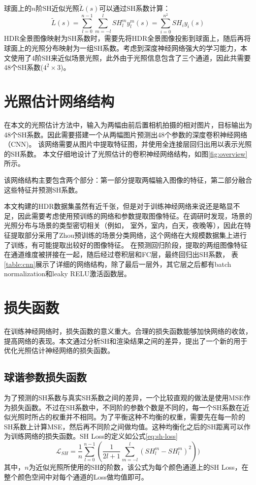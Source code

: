球面上的$n$阶SH近似光照$\tilde{L}(s)$可以通过SH系数计算：
\begin{equation}
    \tilde{L}(s)=\sum_{l=0}^{n-1}\sum_{m=-l}^{l}SH^m_ly^m_l(s)=\sum_{i=0}^{n^2}SH_iy_i(s)
\end{equation}
HDR全景图像映射为SH系数时，需要先将HDR全景图像投影到球面上，随后再将球面上的光照分布映射为一组SH系数。考虑到深度神经网络强大的学习能力，本文使用了4阶SH来近似场景光照，此外由于光照信息包含了三个通道，因此共需要48个SH系数($4^2\times3$)。
\section{光照估计网络结构}
在本文的光照估计方法中，输入为两幅由前后置相机拍摄的相对图片，目标输出为48个SH系数。因此需要搭建一个从两幅图片预测出48个参数的深度卷积神经网络（CNN)。
该网络需要从图片中提取特征图，并使用全连接层回归出用以表示光照的SH系数。
本文仔细地设计了光照估计的卷积神经网络结构，如图\ref{fig:overview}所示。



该网络结构主要包含两个部分：第一部分提取两幅输入图像的特征，第二部分融合这些特征并预测SH系数。 

本文构建的HDR数据集虽然有近千张，但是对于训练神经网络来说还是略显不足，因此需要考虑使用预训练的网络和参数提取图像特征。在调研时发现，场景的光照分布与场景的类型密切相关（例如， 室外，室内，白天，夜晚等），因此在特征提取部分采用了Zhou预训练的场景分类网络\cite{zhou2017places}，这个网络在大规模数据集上进行了训练，有可能提取出较好的图像特征。 在预测回归阶段，提取的两组图像特征在通道维度被拼接在一起，随后经过卷积层和FC层，最终回归出SH系数， 表\ref{table:cnn}展示了详细的网络结构，除了最后一层外，其它层之后都有batch normalization和leaky RELU激活函数层。


\section{损失函数}\label{sec:loss-function}
在训练神经网络时，损失函数的意义重大。合理的损失函数能够加快网络的收敛，提高网络的表现。本文通过分析SH和渲染结果之间的差异，提出了一个新的用于优化光照估计神经网络的损失函数。
\subsection{球谐参数损失函数} 为了预测的SH系数与真实SH系数之间的差异，一个比较直观的做法是使用MSE作为损失函数。不过在SH系数中，不同阶的参数个数是不同的，每一个SH系数在近似光照时所占的权重并不相同。为了平衡这种不均衡的权重，需要先在每一阶的SH系数上计算MSE，然后再不同阶之间做均值。这种均衡化之后的SH距离可以作为训练网络的损失函数。SH Loss的定义如公式\ref{eq:sh-loss}
\begin{equation}
    \mathcal{L}_{SH} = \frac{1}{n}\sum_{l=0}^{n-1}(\frac{1}{2l+1}\sum_{m=-l}^{l}(SH^m_l - SH^m_l)^2))
    \label{eq:sh-loss}
\end{equation}
其中，$n$为近似光照所使用的SH的阶数，该公式为每个颜色通道上的SH Loss，在整个颜色空间中对每个通道的Loss做均值即可。

